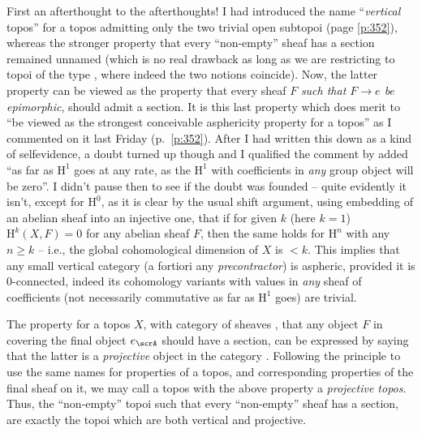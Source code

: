 First an afterthought to the afterthoughts! I had introduced the name
``\emph{vertical} topos'' for a topos admitting only the two trivial
open subtopoi (page \ref{p:352}), whereas the stronger property that
every ``non-empty'' sheaf has a section remained unnamed (which is no
real drawback as long as we are restricting to topoi of the type
\Ahat, where indeed the two notions coincide). Now, the latter
property can be viewed as the property that every sheaf $F$ \emph{such
  that $F\to e$ be epimorphic}, should admit a section. It is this
last property which does merit to ``be viewed as the strongest
conceivable asphericity property for a topos'' as I commented on it
last Friday (p.\ \ref{p:352}). After I had written this down as a kind
of selfevidence, a doubt turned up though and I qualified the comment
by added ``as far as $\mathrm H^1$ goes at any rate, as the $\mathrm
H^1$ with coefficients in \emph{any} group object will be zero''. I
didn't pause then to see if the doubt was founded -- quite evidently
it isn't, except for $\mathrm H^0$, as it is clear by the usual shift
argument, using embedding of an abelian sheaf into an injective one,
that if for given $k$ (here $k=1$) $\mathrm H^k(X,F)=0$ for any
abelian sheaf $F$, then the same holds for $\mathrm H^n$ with any
$n\ge k$ -- i.e., the global cohomological dimension of $X$ is
$<k$. This implies that any small vertical category (a fortiori any
\emph{precontractor}) is aspheric, provided it is $0$-connected,
indeed its cohomology variants with values in \emph{any} sheaf of
coefficients (not necessarily commutative as far as $\mathrm H^1$
goes) are trivial.

The property for a topos $X$, with category of sheaves
\scrA, that any object $F$ in \scrA{} covering the final object
$e_\scrA$ should have a section, can be expressed by saying that the
latter is a \emph{projective} object in the category \scrA. Following
the principle to use the same names for properties of a topos, and
corresponding properties of the final sheaf on it, we may call a topos
with the above property a \emph{projective topos}. Thus, the
``non-empty'' topoi such that every ``non-empty'' sheaf has a section,
are exactly the topoi which are both vertical and projective.

\starsbreak

